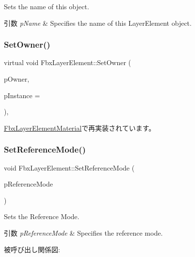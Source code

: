 Sets the name of this object. 
\begin{DoxyParams}{引数}
{\em p\+Name} & Specifies the name of this Layer\+Element object. \\
\hline
\end{DoxyParams}
\mbox{\label{class_fbx_layer_element_ab4740c4774c0600f91515fb2c022f0ef}} 
\subsubsection{\texorpdfstring{Set\+Owner()}{SetOwner()}}
{\footnotesize\ttfamily virtual void Fbx\+Layer\+Element\+::\+Set\+Owner (\begin{DoxyParamCaption}\item[{\hyperlink{class_fbx_layer_container}{Fbx\+Layer\+Container} $\ast$}]{p\+Owner,  }\item[{int}]{p\+Instance = {} }\end{DoxyParamCaption})\hspace{0.3cm}{\ttfamily [protected]}, {\ttfamily [virtual]}}



\hyperlink{class_fbx_layer_element_material_afe025ea61981c53c05cb97bcd9174631}{Fbx\+Layer\+Element\+Material}で再実装されています。

\mbox{\label{class_fbx_layer_element_a725681d86b87ca356eda6bb681026257}} 
\subsubsection{\texorpdfstring{Set\+Reference\+Mode()}{SetReferenceMode()}}
{\footnotesize\ttfamily void Fbx\+Layer\+Element\+::\+Set\+Reference\+Mode (\begin{DoxyParamCaption}\item[{\hyperlink{class_fbx_layer_element_a00f04654580ca9b2f5d292c11abd83fc}{E\+Reference\+Mode}}]{p\+Reference\+Mode }\end{DoxyParamCaption})}

Sets the Reference Mode. 
\begin{DoxyParams}{引数}
{\em p\+Reference\+Mode} & Specifies the reference mode. \\
\hline
\end{DoxyParams}
被呼び出し関係図\+:
\mbox{\label{class_fbx_layer_element_a017f6f6c44dd71778739b7d909c35fa8}} 
